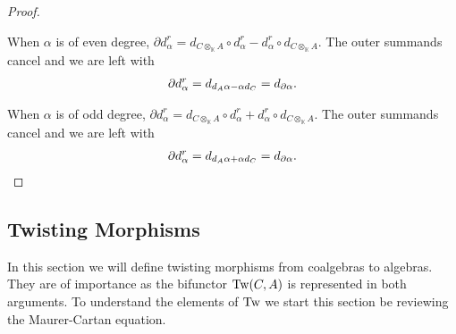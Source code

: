 \documentclass[../thesis.tex]{subfiles}
\begin{document}
\begin{proof}
\begin{center}
\begin{tikzpicture}
                    \end{tikzpicture}
                \end{center}

                When $\alpha$ is of even degree, $\partial d_\alpha^r = d_{C\otimes_\mathbb{K}A}\circ d^r_\alpha - d^r_\alpha\circ d_{C\otimes_\mathbb{K}A}$. The outer summands cancel and we are left with
                \begin{align*}
                    \partial d_\alpha^r = d_{d_A \alpha - \alpha d_C} = d_{\partial \alpha}\tt{.}
                \end{align*}

                When $\alpha$ is of odd degree, $\partial d_\alpha^r = d_{C\otimes_\mathbb{K}A}\circ d^r_\alpha + d^r_\alpha\circ d_{C\otimes_\mathbb{K}A}$. The outer summands cancel and we are left with
                \begin{align*}
                    \partial d_\alpha^r = d_{d_A \alpha + \alpha d_C} = d_{\partial \alpha}\tt{.}
                \end{align*}
            \end{proof}

    \subsection{Twisting Morphisms}

            In this section we will define twisting morphisms from coalgebras to algebras. They are of importance as the bifunctor $\tt{Tw}(C,A)$ is represented in both arguments. To understand the elements of $\tt{Tw}$ we start this section be reviewing the Maurer-Cartan equation.
\end{document}
